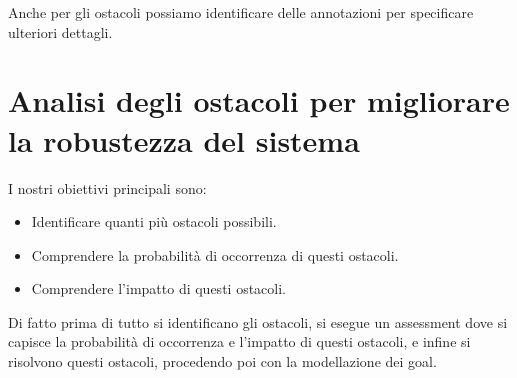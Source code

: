 Anche per gli ostacoli possiamo identificare delle annotazioni per specificare ulteriori dettagli.

\section{Analisi degli ostacoli per migliorare la robustezza del sistema}
I nostri obiettivi principali sono:
\begin{itemize}
    \item Identificare quanti più ostacoli possibili.
    \item Comprendere la probabilità di occorrenza di questi ostacoli.
    \item Comprendere l'impatto di questi ostacoli.
\end{itemize}
\begin{figure}[H]
    \centering
\end{figure}
Di fatto prima di tutto si identificano gli ostacoli, si esegue un assessment dove si capisce 
la probabilità di occorrenza e l'impatto di questi ostacoli, e infine si risolvono questi ostacoli, 
procedendo poi con la modellazione dei goal.
